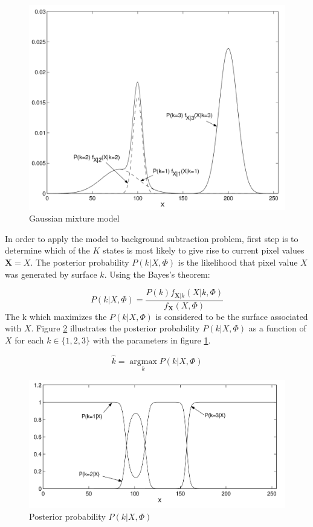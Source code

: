 \begin{figure}
    \centering
    \includegraphics[width=\linewidth]{images/gaussian-mixture-model.png}
    \caption[Gaussian mixture model]{Gaussian mixture model\cite{power2002understanding}}
    \label{fig:gaussian-mixture-model}
\end{figure}

In order to apply the model to background subtraction problem, first step is to determine which of the $K$ states is most likely to give rise to current pixel values $\mathbf{X}=X$. The posterior probability $P(k|X,\Phi)$ is the likelihood that pixel value $X$ was generated by surface $k$. Using the Bayes's theorem:

$$ P(k|X,\Phi) = \frac{P(k)f_{\mathbf{X}|k}(X|k,\Phi)}{f_\mathbf{X}(X,\Phi)} $$
The k which maximizes the $P(k|X,\Phi) $ is considered to be the surface associated with $X$. Figure \ref{fig:gaussian-posterior-probability} illustrates the posterior probability $P(k|X,\Phi) $ as a function of $X$ for each $k\in \{  1,2,3 \}$ with the parameters in figure \ref{fig:gaussian-mixture-model}.

$$ \hat{k}=\operatorname*{argmax}_k P(k|X,\Phi)$$
\begin{figure}
    \centering
    \includegraphics[width=\linewidth]{images/gaussian-posterior-probability.PNG}
    \caption[Posterior probability]{Posterior probability  $P(k|X,\Phi) $\cite{power2002understanding}}
    \label{fig:gaussian-posterior-probability}
\end{figure}


